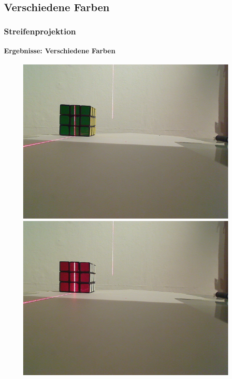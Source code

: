 \documentclass{beamer}
\begin{document}
\subsection{Verschiedene Farben}
\begin{frame}
	\frametitle{Streifenprojektion}
	\framesubtitle{Ergebnisse: Verschiedene Farben}

	\begin{figure}
		\begin{minipage}{0.32\linewidth}
			\includegraphics[width=\linewidth]{includes/test_color_1}
		\end{minipage}
		\hfill
		\begin{minipage}{0.32\linewidth}
			\includegraphics[width=\linewidth]{includes/test_color_2}

\end{minipage}
\end{figure}
\end{frame}
\end{document}
